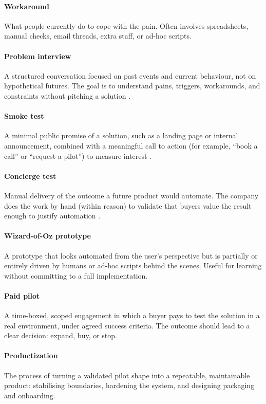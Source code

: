 \documentclass[10pt, a4paper, twocolumn]{article} %
\begin{document}
\paragraph{Workaround} What people currently do to cope with the pain. Often involves spreadsheets, manual checks, email threads, extra staff, or ad-hoc scripts.

\paragraph{Problem interview} A structured conversation focused on past events and current behaviour, not on hypothetical futures. The goal is to understand pains, triggers, workarounds, and constraints without pitching a solution \citep{fitzpatrick2013mom}.

\paragraph{Smoke test} A minimal public promise of a solution, such as a landing page or internal announcement, combined with a meaningful call to action (for example, “book a call” or “request a pilot”) to measure interest \citep{bland2019testing}.

\paragraph{Concierge test} Manual delivery of the outcome a future product would automate. The company does the work by hand (within reason) to validate that buyers value the result enough to justify automation \citep{bland2019testing}.

\paragraph{Wizard-of-Oz prototype} A prototype that looks automated from the user’s perspective but is partially or entirely driven by humans or ad-hoc scripts behind the scenes. Useful for learning without committing to a full implementation.

\paragraph{Paid pilot} A time-boxed, scoped engagement in which a buyer pays to test the solution in a real environment, under agreed success criteria. The outcome should lead to a clear decision: expand, buy, or stop.

\paragraph{Productization} The process of turning a validated pilot shape into a repeatable, maintainable product: stabilising boundaries, hardening the system, and designing packaging and onboarding.
\end{document}
